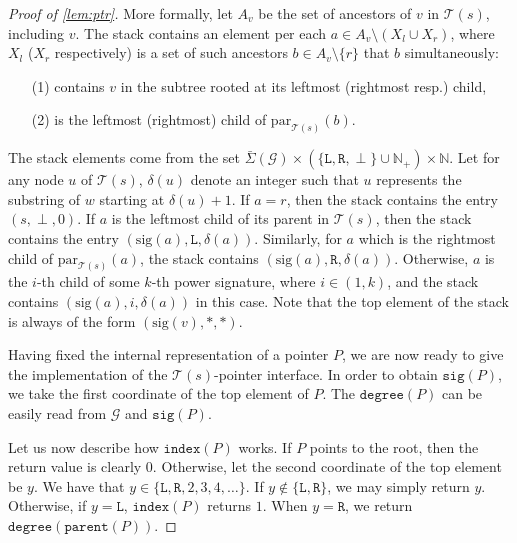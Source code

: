 \documentclass[a4paper]{article}
\theoremstyle{remark}
\newcommand{\sigs}{\bar{\Sigma}}
\newcommand{\grammar}{\mathcal{G}}
\newcommand{\stree}{\mathcal{T}}
\newcommand{\spar}[1]{\mathrm{par}_{\stree(#1)}}
\newcommand{\ussig}{\mathrm{sig}}
\newcommand{\itparent}{\mathtt{parent}}
\newcommand{\itindex}{\mathtt{index}}
\newcommand{\itdegree}{\mathtt{degree}}
\newcommand{\itsig}{\mathtt{sig}}
\begin{document}
\begin{proof}[Proof of \cref{lem:ptr}]
More formally, let $A_v$ be the set of ancestors of $v$ in $\stree(s)$,
including $v$.
The stack contains an element per each $a\in A_v\setminus (X_l\cup X_r)$, where
$X_l$ ($X_r$ respectively) is a set of such ancestors $b\in A_v\setminus\{r\}$ that $b$ simultaneously:
\begin{itemize}
  \item[(1)] contains $v$ in the subtree rooted at its leftmost (rightmost resp.) child,
  \item[(2)] is the leftmost (rightmost) child of $\spar{s}(b)$.
\end{itemize}
The stack elements come from the set
$\sigs(\grammar)\times(\{\texttt{L},\texttt{R},\perp\}\cup\mathbb{N}_+)\times \mathbb{N}$.
Let for any node $u$ of $\stree(s)$, $\delta(u)$ denote an
integer such that $u$ represents the substring of $w$ starting at $\delta(u)+1$.
If $a=r$, then the stack contains the entry $(s,\perp,0)$.
If $a$ is the leftmost child of its parent in $\stree(s)$, then the stack
contains the entry $(\ussig(a),\texttt{L},\delta(a))$.
Similarly, for $a$ which is the rightmost child of $\spar{s}(a)$,
the stack contains $(\ussig(a),\texttt{R},\delta(a))$.
Otherwise, $a$ is the $i$-th child of some $k$-th power signature, where
$i\in(1,k)$, and the stack contains $(\ussig(a),i,\delta(a))$ in this case.
Note that the top element of the stack is always of the form $(\ussig(v),*,*)$.

Having fixed the internal representation of a pointer $P$, we are
now ready to give the implementation of the $\stree(s)$-pointer interface.
In order to obtain $\itsig(P)$, we take the first coordinate of the top element of $P$.
The $\itdegree(P)$ can be easily read from $\grammar$ and $\itsig(P)$.

Let us now describe how $\itindex(P)$ works.
If $P$ points to the root, then the return value is clearly $0$.
Otherwise, let the second coordinate of the top element be $y$.
We have that $y \in \{\texttt{L}, \texttt{R}, 2, 3, 4, \ldots\}$.
If $y \not\in \{\texttt{L}, \texttt{R}\}$, we may simply return $y$.
Otherwise, if $y = \texttt{L}$, $\itindex(P)$ returns $1$.
When $y = \texttt{R}$, we return $\itdegree(\itparent(P))$.


\end{proof}
\end{document}
